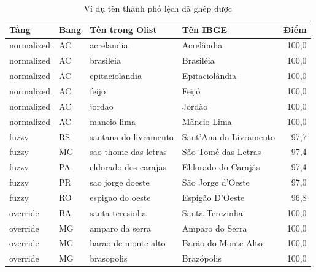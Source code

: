 \begin{table}[htbp]\centering\scriptsize\caption{Ví dụ tên thành phố lệch đã ghép được}\label{tab:api-match-ex}
\begin{tabular}{llllr}\toprule
\textbf{Tầng} & \textbf{Bang} & \textbf{Tên trong Olist} & \textbf{Tên IBGE} & \textbf{Điểm} \\\midrule
normalized & AC & acrelandia & Acrelândia & 100,0 \\
normalized & AC & brasileia & Brasiléia & 100,0 \\
normalized & AC & epitaciolandia & Epitaciolândia & 100,0 \\
normalized & AC & feijo & Feijó & 100,0 \\
normalized & AC & jordao & Jordão & 100,0 \\
normalized & AC & mancio lima & Mâncio Lima & 100,0 \\
fuzzy & RS & santana do livramento & Sant'Ana do Livramento & 97,7 \\
fuzzy & MG & sao thome das letras & São Tomé das Letras & 97,4 \\
fuzzy & PA & eldorado dos carajas & Eldorado do Carajás & 97,4 \\
fuzzy & PR & sao jorge doeste & São Jorge d'Oeste & 97,0 \\
fuzzy & RO & espigao do oeste & Espigão D'Oeste & 96,8 \\
override & BA & santa teresinha & Santa Terezinha & 100,0 \\
override & MG & amparo da serra & Amparo do Serra & 100,0 \\
override & MG & barao de monte alto & Barão do Monte Alto & 100,0 \\
override & MG & brasopolis & Brazópolis & 100,0 \\
\bottomrule\end{tabular}
\end{table}

